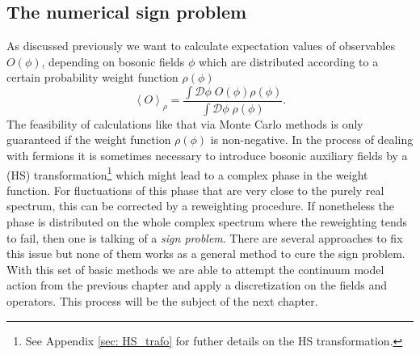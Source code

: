 \subsection{The numerical sign problem}\label{sec: sign_prob}
As discussed previously we want to calculate expectation values of observables $O(\phi)$, depending on bosonic fields $\phi$ which are distributed according to a certain probability weight function $\rho(\phi)$
%
%
\begin{equation}
\left\langle O \right\rangle_{\rho} = \frac{\int \mathcal{D}\phi\; O(\phi)\rho(\phi)}{\int \mathcal{D}\phi\; \rho(\phi)}.
\end{equation}
%
%
The feasibility of calculations like that via Monte Carlo methods is only guaranteed if the weight function $\rho(\phi)$ is non-negative. In the process of dealing with fermions it is sometimes necessary to introduce bosonic auxiliary fields by a  (HS)  transformation\footnote{See Appendix \ref{sec: HS_trafo} for futher details on the HS transformation.} which might lead to a complex phase in the weight function. For fluctuations of this phase that are very close to the purely real spectrum, this can be corrected by a reweighting procedure. If nonetheless the phase is distributed on the whole complex spectrum where the reweighting tends to fail, then one is talking of a \textit{sign problem}. There are several approaches to fix this issue but none of them works as a general method to cure the sign problem. \\[1cm]
%
With this set of basic methods we are able to attempt the continuum model action from the previous chapter and apply a discretization on the fields and operators. This process will be the subject of the next chapter.
